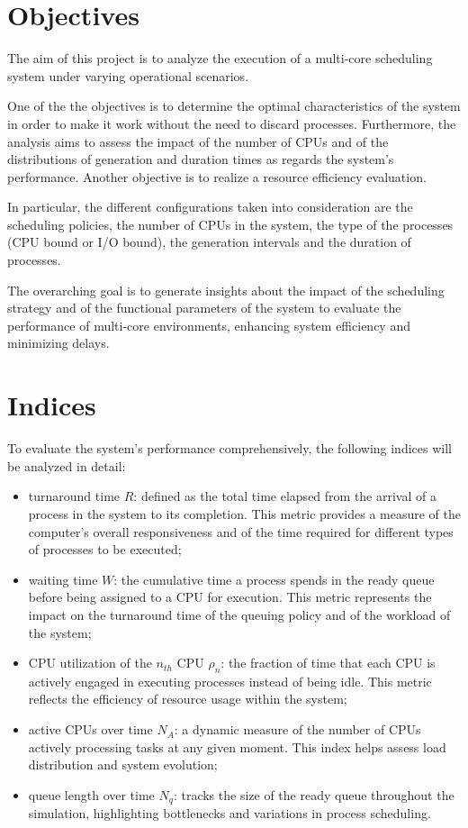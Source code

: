 \section{Objectives}

The aim of this project is to analyze the execution of a multi-core 
scheduling system under varying operational scenarios. 

One of the the objectives is 
to determine the optimal characteristics of the system in order to make 
it work without the need to discard processes. Furthermore, the analysis 
aims to assess the impact of the number of CPUs and of the distributions
of generation and duration times as regards the system’s performance.
Another objective is to realize a resource efficiency evaluation. 

In particular, 
the different configurations taken into 
consideration are the scheduling policies, the number of CPUs in the 
system, the type of the processes (CPU bound or I/O bound), the 
generation intervals and the duration of processes.

The overarching goal is to generate insights about the impact of the scheduling 
strategy and of the functional parameters of the system to evaluate
the performance of multi-core environments, 
enhancing system efficiency and minimizing delays.


\section{Indices}

To evaluate the system’s performance comprehensively, the following indices will be analyzed in detail:
\begin{itemize}
    \item turnaround time $R$: defined as the total time elapsed from the arrival of a process in the system to its completion. This metric provides a measure of the computer’s overall responsiveness and of the time required for different types of processes to be executed;
    \item waiting time $W$: the cumulative time a process spends in the ready queue before being assigned to a CPU for execution. This metric represents the impact on the turnaround time of the queuing policy and of the workload of the system;
    \item CPU utilization of the $n_{th}$ CPU $\rho_n$: the fraction of time that each CPU is actively engaged in executing processes instead of being idle. This metric reflects the efficiency of resource usage within the system;
    \item active CPUs over time $N_A$: a dynamic measure of the number of CPUs actively processing tasks at any given moment. This index helps assess load distribution and system evolution;
    \item queue length over time $N_q$: tracks the size of the ready queue throughout the simulation, highlighting bottlenecks and variations in process scheduling.
\end{itemize}

